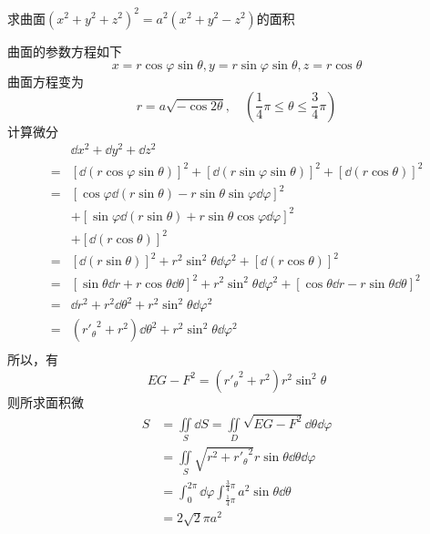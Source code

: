 \begin{example}
    求曲面$(x^2+y^2+z^2)^2 = a^2(x^2+y^2-z^2)$的面积
\end{example}
\begin{solution}
    曲面的参数方程如下
    \[ x=r\cos\varphi\sin\theta, y=r\sin\varphi\sin\theta,z=r\cos\theta \]
    曲面方程变为
    \[ r = a\sqrt{-\cos 2\theta},\quad (\frac{1}{4}\pi \leq \theta \leq \frac{3}{4}\pi) \]
    计算微分
    \begin{align*}
          & \dd{x^2} + \dd{y^2} + \dd{z^2}                                                                                               \\
        = & [\dd(r\cos\varphi\sin\theta)]^2 + [\dd(r\sin\varphi\sin\theta)]^2 + [\dd(r\cos\theta)]^2                                     \\
        = & [\cos\varphi\dd(r\sin\theta) - r\sin\theta\sin\varphi \dd{\varphi}]^2                                                        \\
          & +[\sin\varphi\dd(r\sin\theta) +r\sin\theta\cos\varphi\dd{\varphi}]^2                                                         \\
          & +[\dd(r\cos\theta)]^2                                                                                                        \\
        = & [\dd{(r\sin\theta)}]^2 + r^2\sin^2\theta\dd{\varphi^2} + [\dd{(r\cos\theta)}]^2                                              \\
        = & [\sin\theta\dd{r} + r\cos\theta\dd{\theta}]^2 + r^2\sin^2\theta\dd{\varphi^2} + [\cos\theta\dd{r} -r\sin\theta\dd{\theta}]^2 \\
        = & \dd{r^2} + r^2\dd{\theta^2} + r^2\sin^2\theta\dd{\varphi^2}                                                                  \\
        = & ({r'_\theta}^2 + r^2)\dd{\theta^2} + r^2\sin^2\theta\dd{\varphi^2}                                                           \\
    \end{align*}
    所以，有
    \[ EG-F^2 = ({r'_\theta}^2 + r^2)r^2\sin^2\theta \]
    则所求面积微
    \begin{align*}
        S & = \iint\limits_S \dd{S} = \iint\limits_D \sqrt{EG-F^2}\dd{\theta}\dd{\varphi}               \\
          & = \iint\limits_S \sqrt{r^2 + {r'_\theta}^2} r\sin\theta\dd{\theta}\dd{\varphi}              \\
          & = \int_0^{2\pi}\dd{\varphi}\int_{\frac{1}{4}\pi}^{\frac{3}{4}\pi} a^2 \sin\theta\dd{\theta} \\
          & = 2\sqrt{2}\pi a^2
    \end{align*}
\end{solution}

